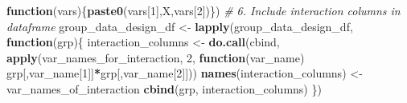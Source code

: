 \documentclass[
]{article}
\newenvironment{Shaded}{\begin{snugshade}}{\end{snugshade}}
\newcommand{\CommentTok}[1]{\textcolor[rgb]{0.56,0.35,0.01}{\textit{#1}}}
\newcommand{\ControlFlowTok}[1]{\textcolor[rgb]{0.13,0.29,0.53}{\textbf{#1}}}
\newcommand{\DecValTok}[1]{\textcolor[rgb]{0.00,0.00,0.81}{#1}}
\newcommand{\FunctionTok}[1]{\textcolor[rgb]{0.13,0.29,0.53}{\textbf{#1}}}
\newcommand{\NormalTok}[1]{#1}
\newcommand{\OtherTok}[1]{\textcolor[rgb]{0.56,0.35,0.01}{#1}}
\newcommand{\SpecialCharTok}[1]{\textcolor[rgb]{0.81,0.36,0.00}{\textbf{#1}}}
\newcommand{\StringTok}[1]{\textcolor[rgb]{0.31,0.60,0.02}{#1}}
\begin{document}
\begin{Shaded}
\begin{Highlighting}[]
                                  \ControlFlowTok{function}\NormalTok{(vars)\{}\FunctionTok{paste0}\NormalTok{(vars[}\DecValTok{1}\NormalTok{],}\StringTok{\textquotesingle{}X\textquotesingle{}}\NormalTok{,vars[}\DecValTok{2}\NormalTok{])\})}
\CommentTok{\# 6. Include interaction columns in dataframe}
\NormalTok{group\_data\_design\_df }\OtherTok{\textless{}{-}} \FunctionTok{lapply}\NormalTok{(group\_data\_design\_df,}
                               \ControlFlowTok{function}\NormalTok{(grp)\{}
\NormalTok{                                 interaction\_columns }\OtherTok{\textless{}{-}} \FunctionTok{do.call}\NormalTok{(cbind,}
                                                                \FunctionTok{apply}\NormalTok{(var\_names\_for\_interaction, }\DecValTok{2}\NormalTok{, }\ControlFlowTok{function}\NormalTok{(var\_name) grp[,var\_name[}\DecValTok{1}\NormalTok{]]}\SpecialCharTok{*}\NormalTok{grp[,var\_name[}\DecValTok{2}\NormalTok{]]))}
                                 \FunctionTok{names}\NormalTok{(interaction\_columns) }\OtherTok{\textless{}{-}}\NormalTok{ var\_names\_of\_interaction}
                                 \FunctionTok{cbind}\NormalTok{(grp, interaction\_columns)}
\NormalTok{                               \})}


\end{Highlighting}
\end{Shaded}
\end{document}
